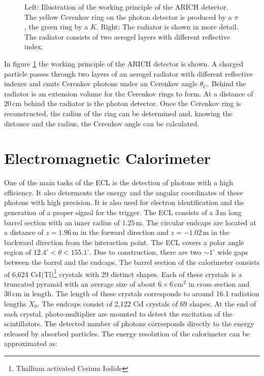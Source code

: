\documentclass[a4paper,11pt,twosided,final,german,openbib,pdftex,listof=totoc,bibliography=totoc]{scrbook}
\begin{document}
\begin{figure}[h!]
	\caption[ARICH]{Left: Illustration of the working principle of the ARICH detector. The yellow Cerenkov ring on the photon detector is produced by a $\pi$, the green ring by a $K$. Right: The radiator is shown in more detail. The radiator consists of two aerogel layers with different reflective index. \cite{TORASSA} }
\label{fig:ARICH}
\end{figure}

In figure \ref{fig:ARICH} the working principle of the ARICH detector is shown. A charged particle passes through two layers of an aerogel radiator with different reflective indexes and emits Cerenkov photons under an Cerenkov angle $\theta_C$. Behind the radiator is an extension volume for the Cerenkov rings to form. At a distance of $20\,\textrm{cm}$ behind the radiator is the photon detector.\cite{B2TR} Once the Cerenkov ring is reconstructed, the radius of the ring can be determined and, knowing the distance and the radius, the Cerenkov angle can be calculated.

\section{Electromagnetic Calorimeter}
\label{sec:ECL}

One of the main tasks of the ECL is the detection of photons with a high efficiency. It also determents the energy and the angular coordinates of these photons with high precision. It is also used for electron identification and the generation of a proper signal for the trigger. The ECL consists of a $3\,\textrm{m}$ long barrel section with an inner radius of $1.25\,\textrm{m}$. The circular endcaps are located at a distance of $z=1.96\,\textrm{m}$ in the forward direction and $z=-1.02\,\textrm{m}$ in the backward direction from the interaction point. The ECL covers a polar angle region of $12.4^{\circ} < \theta < 155.1^{\circ}$. Due to construction, there are two $ \sim 1^{\circ}$ wide gaps between the barrel and the endcaps. The barrel section of the calorimeter consists of 6,624 CsI(Tl)\footnote{Thallium activated Cesium Iodide} crystals with 29 distinct shapes. Each of these crystals is a truncated pyramid with an average size of about $6\times6 \, \textrm{cm}^2$ in cross section and $30\,\textrm{cm}$ in length. The length of these crystals corresponds to around 16.1 radiation lengths $X_0$. The endcaps consist of 2,122 CsI crystals of 69 shapes. At the end of each crystal, photo-multiplier are mounted to detect the excitation of the scintillators. The detected number of photons corresponds directly to the energy released by absorbed particles.
The energy resolution of the calorimeter can be approximated as:\cite{B2TR} \cite{Belle_ECL_2015}
\end{document}
